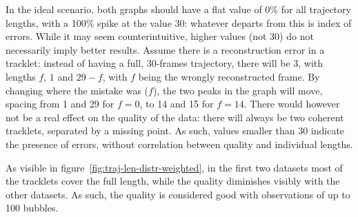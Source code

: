 In the ideal scenario, both graphs should have a flat value of 0\% for all trajectory lengths, with a 100\% spike at the value 30: whatever departs from this is index of errors.
While it may seem counterintuitive, higher values (not 30) do not necessarily imply better results.
Assume there is a reconstruction error in a tracklet: instead of having a full, 30-frames trajectory, there will be 3, with lengths $f$, $1$ and $29-f$, with $f$ being the wrongly reconstructed frame.
By changing where the mistake was ($f$), the two peaks in the graph will move, spacing from 1 and 29 for $f{=}0$, to 14 and 15 for $f{=}14$.
There would however not be a real effect on the quality of the data: there will always be two coherent tracklets, separated by a missing point.
As such, values smaller than 30 indicate the presence of errors, without correlation between quality and individual lengths.

As visible in figure~\ref{fig:traj-len-distr-weighted}, in the first two datasets most of the tracklets cover the full length, while the quality diminishes visibly with the other datasets.
As such, the quality is considered good with observations of up to 100 bubbles.

